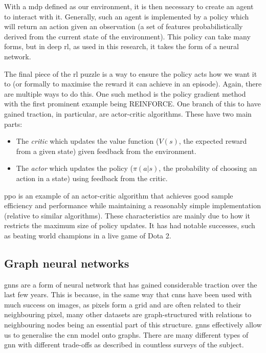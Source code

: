 With a \ac{mdp} defined as our environment, it is then necessary to create an agent to interact with it. Generally, such an agent is implemented by a policy which will return an action given an observation (a set of features probabilistically derived from the current state of the environment). This policy can take many forms, but in deep \ac{rl}, as used in this research, it takes the form of a neural network.

The final piece of the \ac{rl} puzzle is a way to ensure the policy acts how we want it to (or formally to maximise the reward it can achieve in an episode). Again, there are multiple ways to do this. One such method is the policy gradient method with the first prominent example being REINFORCE\cite{williams1992simple}. One branch of this to have gained traction, in particular, are actor-critic algorithms. These have two main parts:

\begin{itemize}
    \item The \emph{critic} which updates the value function ($V(s)$, the expected reward from a given state) given feedback from the environment.
    \item The \emph{actor} which updates the policy ($\pi(a|s)$, the probability of choosing an action in a state) using feedback from the critic.
\end{itemize}

\Acf{ppo}\cite{schulman2017proximal} is an example of an actor-critic algorithm that achieves good sample efficiency and performance while maintaining a reasonably simple implementation (relative to similar algorithms). These characteristics are mainly due to how it restricts the maximum size of policy updates. It has had notable successes, such as beating world champions in a live game of Dota 2\cite{openai2019dota}.

\subsection{Graph neural networks}
\label{section:graph_neural_networks}

\Acfp{gnn}\cite{gori2005new,scarselli2008graph} are a form of neural network that has gained considerable traction over the last few years. This is because, in the same way that \acp{cnn} have been used with much success on images, as pixels form a grid and are often related to their neighbouring pixel, many other datasets are graph-structured with relations to neighbouring nodes being an essential part of this structure. \Acp{gnn} effectively allow us to generalise the \ac{cnn} model onto graphs. There are many different types of \ac{gnn} with different trade-offs as described in countless surveys of the subject\cite{zhou2018graph,Wu_2020}.

